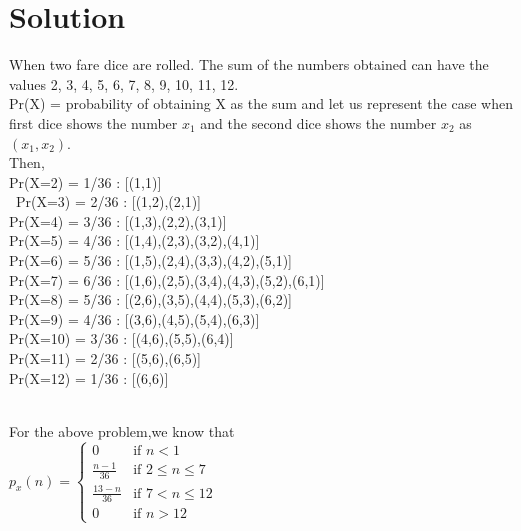 \documentclass[journal,12pt,twocolumn]{IEEEtran}
\begin{document}
\section{Solution}
 When two fare dice are rolled. The sum of the numbers obtained can have the values 2, 3, 4, 5, 6, 7, 8, 9, 10, 11, 12.\\
Pr(X) = probability of obtaining X as the sum and let us represent the case when first dice shows the number $x_1$ and the second dice shows the number $x_2$ as $(x_1,x_2)$.\\
\vspace{2mm}
Then,\\
Pr(X=2) = 1/36 : [(1,1)]\\\
Pr(X=3) = 2/36 : [(1,2),(2,1)]\\
Pr(X=4) = 3/36 : [(1,3),(2,2),(3,1)]\\
Pr(X=5) = 4/36 : [(1,4),(2,3),(3,2),(4,1)]\\
Pr(X=6) = 5/36 : [(1,5),(2,4),(3,3),(4,2),(5,1)]\\
Pr(X=7) = 6/36 : [(1,6),(2,5),(3,4),(4,3),(5,2),(6,1)]\\
Pr(X=8) = 5/36 : [(2,6),(3,5),(4,4),(5,3),(6,2)]\\
Pr(X=9) = 4/36 : [(3,6),(4,5),(5,4),(6,3)]\\
Pr(X=10) = 3/36 : [(4,6),(5,5),(6,4)]\\
Pr(X=11) = 2/36 : [(5,6),(6,5)]\\
Pr(X=12) = 1/36 : [(6,6)]\\
\vspace{5mm}
\renewcommand{\arraystretch}{2}
\begin{table}[hbt!]
\caption{Probability Distribution Table of X}
\label{table:1}
\end{table}\\
For the above problem,we know that\\
$p_x(n) = 
\left\{
	\begin{array}{ll}
		0  & \mbox{if } n < 1 \\
		\displaystyle\frac{n-1}{36} & \mbox{if } 2\leq n \leq 7\\
		\displaystyle\frac{13-n}{36} & \mbox{if } 7<n \leq 12\\
		0 & \mbox{if } n > 12
	\end{array}
\right.$
\end{document}
